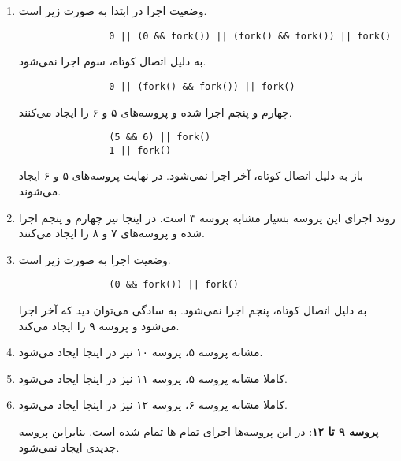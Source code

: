 \documentclass{article}
\begin{document}
\begin{enumerate}[label=\textbf{پروسه \arabic*}:, leftmargin=6em]
	 	\item
	 	وضعیت اجرا در ابتدا به صورت زیر است.
	 	\begin{latin}
	 		\begin{verbatim}
	 			0 || (0 && fork()) || (fork() && fork()) || fork()
	 		\end{verbatim}
	 	\end{latin}

	 	به دلیل اتصال کوتاه،
	 	سوم اجرا نمی‌شود.

	 	\begin{latin}
	 		\begin{verbatim}
	 			0 || (fork() && fork()) || fork()
	 		\end{verbatim}
	 	\end{latin}

 		چهارم و پنجم اجرا شده و پروسه‌های ۵ و ۶ را ایجاد می‌کنند.

 		\begin{latin}
 			\begin{verbatim}
 				(5 && 6) || fork()
 				1 || fork()
 			\end{verbatim}
 		\end{latin}

		باز به دلیل اتصال کوتاه،
		آخر اجرا نمی‌شود. در نهایت پروسه‌های ۵ و ۶ ایجاد می‌شوند.

		\item
		روند اجرای این پروسه بسیار مشابه پروسه ۳ است. در اینجا نیز
		چهارم و پنجم اجرا شده و پروسه‌های ۷ و ۸ را ایجاد می‌کنند.

		\item
		وضعیت اجرا به صورت زیر است.
		\begin{latin}
			\begin{verbatim}
				(0 && fork()) || fork()
			\end{verbatim}
		\end{latin}

		به دلیل اتصال کوتاه،
		پنجم اجرا نمی‌شود. به سادگی می‌توان دید که
		آخر اجرا می‌شود و پروسه ۹ را ایجاد می‌کند.

		\item
		مشابه پروسه ۵، پروسه ۱۰ نیز در اینجا ایجاد می‌شود.

		\item
		کاملا مشابه پروسه ۵، پروسه ۱۱ نیز در اینجا ایجاد می‌شود.

		\item
		کاملا مشابه پروسه ۶، پروسه ۱۲ نیز در اینجا ایجاد می‌شود.

		\item[\textbf{پروسه ۹ تا ۱۲}:]
		در این پروسه‌ها اجرای تمام
		‌ها
		تمام شده است. بنابراین پروسه جدیدی ایجاد نمی‌شود.

	\end{enumerate}
\end{document}
